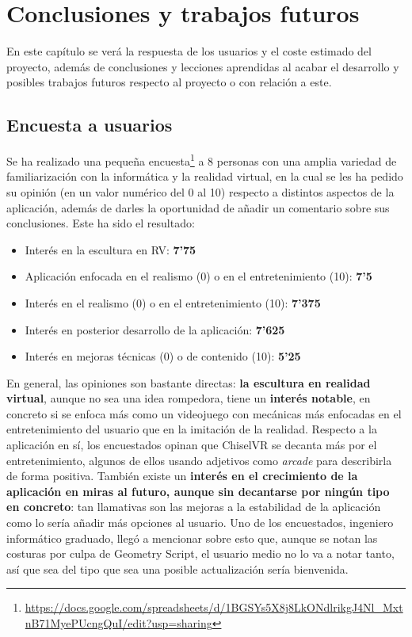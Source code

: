 \chapter{Conclusiones y trabajos futuros}

En este capítulo se verá la respuesta de los usuarios y el coste estimado del proyecto, además de conclusiones y lecciones aprendidas al acabar el desarrollo y posibles trabajos futuros respecto al proyecto o con relación a este.

\section{Encuesta a usuarios}

Se ha realizado una pequeña encuesta\footnote{\url{https://docs.google.com/spreadsheets/d/1BGSYs5X8j8LkONdlrikgJ4Nl_MxtnB71MyePUcngQuI/edit?usp=sharing}} a 8 personas con una amplia variedad de familiarización con la informática y la realidad virtual, en la cual se les ha pedido su opinión (en un valor numérico del 0 al 10) respecto a distintos aspectos de la aplicación, además de darles la oportunidad de añadir un comentario sobre sus conclusiones. Este ha sido el resultado:

\begin{itemize}
    \item Interés en la escultura en RV: \textbf{7'75}
    \item Aplicación enfocada en el realismo (0) o en el entretenimiento (10): \textbf{7'5}
    \item Interés en el realismo (0) o en el entretenimiento (10): \textbf{7'375}
    \item Interés en posterior desarrollo de la aplicación: \textbf{7'625}
    \item Interés en mejoras técnicas (0) o de contenido (10): \textbf{5'25}
\end{itemize}

En general, las opiniones son bastante directas: \textbf{la escultura en realidad virtual}, aunque no sea una idea rompedora, tiene un \textbf{interés notable}, en concreto si se enfoca más como un videojuego con mecánicas más enfocadas en el entretenimiento del usuario que en la imitación de la realidad. Respecto a la aplicación en sí, los encuestados opinan que ChiselVR se decanta más por el entretenimiento, algunos de ellos usando adjetivos como \textit{arcade} para describirla de forma positiva. También existe un \textbf{interés en el crecimiento de la aplicación en miras al futuro, aunque sin decantarse por ningún tipo en concreto}: tan llamativas son las mejoras a la estabilidad de la aplicación como lo sería añadir más opciones al usuario. Uno de los encuestados, ingeniero informático graduado, llegó a mencionar sobre esto que, aunque se notan las costuras por culpa de Geometry Script, el usuario medio no lo va a notar tanto, así que sea del tipo que sea una posible actualización sería bienvenida.

